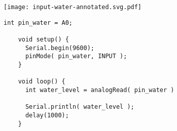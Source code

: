 \vspace{0.1in}
\begin{minipage}[t]{0.49\tw}
  \vspace{0pt}

  \texttt{[image: input-water-annotated.svg.pdf]}
\end{minipage}
\hfill
\begin{minipage}[t]{0.49\tw}
  \vspace{0.1in}
  \begin{Verbatim}[gobble=3,fontsize=\small]
    int pin_water = A0;

    void setup() {
      Serial.begin(9600);
      pinMode( pin_water, INPUT );
    }

    void loop() {
      int water_level = analogRead( pin_water )

      Serial.println( water_level );
      delay(1000);
    }
  \end{Verbatim}
\end{minipage}
\vspace{0.1in}

